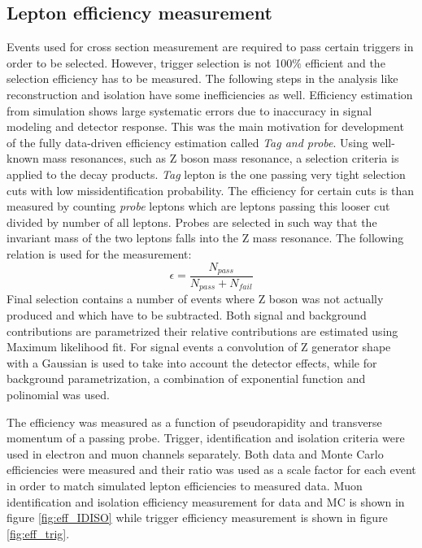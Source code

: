 \subsection{Lepton efficiency measurement}

Events used for cross section measurement are required to pass certain triggers in order to be selected. However, trigger selection is not 100$\%$ efficient and the selection efficiency has to be measured. The following steps in the analysis like reconstruction and isolation have some inefficiencies as well. Efficiency estimation from simulation shows large systematic errors due to inaccuracy in signal modeling and detector response. This was the main motivation for development of the fully data-driven efficiency estimation called \textit{Tag and probe}. Using well-known mass resonances, such as Z boson mass resonance, a selection criteria is applied to the decay products. \textit{Tag} lepton is the one passing very tight selection cuts with low missidentification probability. The efficiency for certain cuts is than measured by counting \textit{probe} leptons which are leptons passing this looser cut divided by number of all leptons. Probes are selected in such way that the invariant mass of the two leptons falls into the Z mass resonance. The following relation is used for the measurement:
\begin{equation}
\epsilon = \frac{N_{pass}}{N_{pass}+N_{fail}}
\end{equation}   
Final selection contains a number of events where Z boson was not actually produced and which have to be subtracted. Both signal and background contributions are parametrized their relative contributions are estimated using Maximum likelihood fit. For signal events a convolution of Z generator shape with a Gaussian is used to take into account the detector effects, while for background parametrization, a combination of exponential function and polinomial was used.
\par The efficiency was measured as a function of pseudorapidity and transverse momentum of a passing probe. Trigger, identification and isolation criteria were used in electron and muon channels separately. Both data and Monte Carlo efficiencies were measured and their ratio was used as a scale factor for each event in order to match simulated lepton efficiencies to measured data. Muon identification and isolation efficiency measurement for data and MC is shown in figure \ref{fig:eff_IDISO} while trigger efficiency measurement is shown in figure \ref{fig:eff_trig}.

